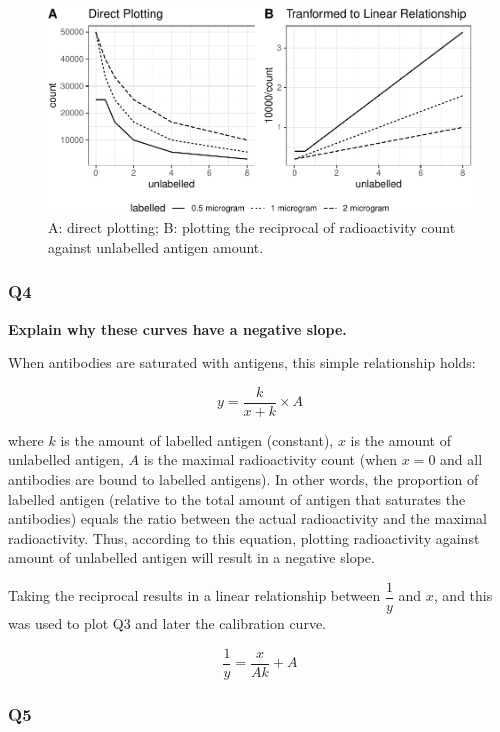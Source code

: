 \documentclass[
]{article}
\begin{document}
\begin{figure}
\includegraphics[width=1\linewidth]{2020-03-08-immunoassay-in-silico_files/figure-latex/q2-1} \caption{A: direct plotting; B: plotting the reciprocal of radioactivity count against unlabelled antigen amount.}\label{fig:q2}
\end{figure}

\hypertarget{q4}{%
\subsubsection*{Q4}\label{q4}}

\textbf{Explain why these curves have a negative slope.}

When antibodies are saturated with antigens, this simple relationship holds:

\[y=\dfrac{k}{x+k}\times A\]

where \(k\) is the amount of labelled antigen (constant), \(x\) is the amount of unlabelled antigen, \(A\) is the maximal radioactivity count (when \(x=0\) and all antibodies are bound to labelled antigens). In other words, the proportion of labelled antigen (relative to the total amount of antigen that saturates the antibodies) equals the ratio between the actual radioactivity and the maximal radioactivity. Thus, according to this equation, plotting radioactivity against amount of unlabelled antigen will result in a negative slope.

Taking the reciprocal results in a linear relationship between \(\dfrac{1}{y}\) and \(x\), and this was used to plot Q3 and later the calibration curve.

\[\dfrac{1}{y}=\dfrac{x}{Ak} + A\]

\hypertarget{q5}{%
\subsubsection*{Q5}\label{q5}}
\end{document}
